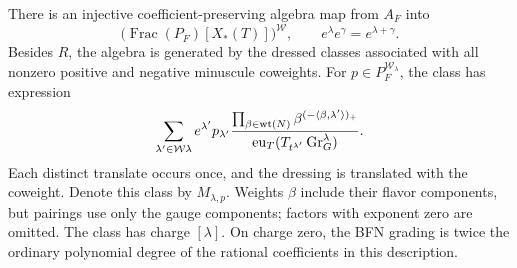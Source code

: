 \begin{proposition}
\label{prop:minuscule}
There is an injective coefficient-preserving algebra map from $A_F$ into
\[
 \bigl(\operatorname{Frac}(P_F)[X_*(T)]\bigr)^{\mathcal W},\qquad
 e^\lambda e^\gamma=e^{\lambda+\gamma}.
\]
Besides $R$, the algebra is generated by the dressed classes associated
with all nonzero positive and negative minuscule coweights.  For
$p\in P_F^{\mathcal W_\lambda}$, the class has expression
\begin{equation}\label{eq:minuscule}
 \sum_{\lambda'\in\mathcal W\lambda}
 e^{\lambda'}p_{\lambda'}
 \frac{\prod_{\beta\in\operatorname{wt}(N)}
           \beta^{(-\langle\beta,\lambda'\rangle)_+}}
      {\operatorname{eu}_T(T_{t^{\lambda'}}\operatorname{Gr}_G^\lambda)}.
\end{equation}
Each distinct translate occurs once, and the dressing is translated
with the coweight.  Denote this class by $M_{\lambda,p}$.
Weights $\beta$ include their flavor components, but
pairings use only the gauge components; factors with exponent zero are
omitted.  The class has charge $[\lambda]$.  On charge zero, the BFN
grading is twice the ordinary polynomial degree of the rational
coefficients in this description.
\end{proposition}

